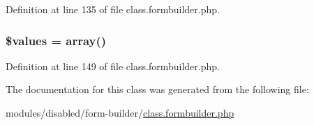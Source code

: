 Definition at line 135 of file class.\-formbuilder.\-php.

\hypertarget{class_form_builder_field_affc45c6ace2eeb3f300b054dbf9592b6}{
\subsubsection[{\$values}]{\setlength{\rightskip}{0pt plus 5cm}\$values = array()}}\label{class_form_builder_field_affc45c6ace2eeb3f300b054dbf9592b6}


Definition at line 149 of file class.\-formbuilder.\-php.



The documentation for this class was generated from the following file\-:\begin{DoxyCompactItemize}
\item 
modules/disabled/form-\/builder/\hyperlink{class_8formbuilder_8php}{class.\-formbuilder.\-php}\end{DoxyCompactItemize}
